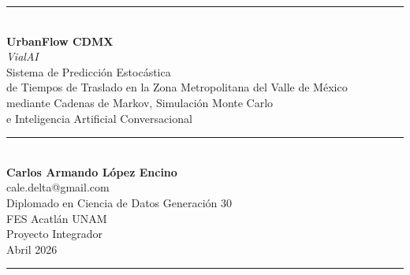 \documentclass[11pt,a4paper]{article}
\begin{document}
\begin{titlepage}
\centering
\vspace*{1.5cm}
{\color{UFgray}\rule{\textwidth}{0.4pt}}\\[1.5cm]
{\Huge\bfseries\color{UFblue} UrbanFlow CDMX}\\[0.4cm]
{\Large\color{UFaccent}\itshape VialAI}\\[1.2cm]
{\LARGE Sistema de Predicción Estocástica\\[0.2cm] de Tiempos de Traslado en la Zona Metropolitana del Valle de México}\\[0.6cm]
{\large mediante Cadenas de Markov, Simulación Monte Carlo\\[0.1cm] e Inteligencia Artificial Conversacional}\\[2cm]
{\color{UFgray}\rule{0.6\textwidth}{0.4pt}}\\[1cm]
{\Large\bfseries Carlos Armando López Encino}\\[0.4cm]
{\large cale.delta@gmail.com}\\[0.4cm]
{\large Diplomado en Ciencia de Datos \textbar{} Generación 30}\\
{\large FES Acatlán \textbar{} UNAM}\\[0.4cm]
{\large Proyecto Integrador}\\[0.4cm]
{\large Abril 2026}\\[1.5cm]
{\color{UFgray}\rule{\textwidth}{0.4pt}}
\vfill
\end{titlepage}

\newpage
\mbox{} %
\newpage
\end{document}
